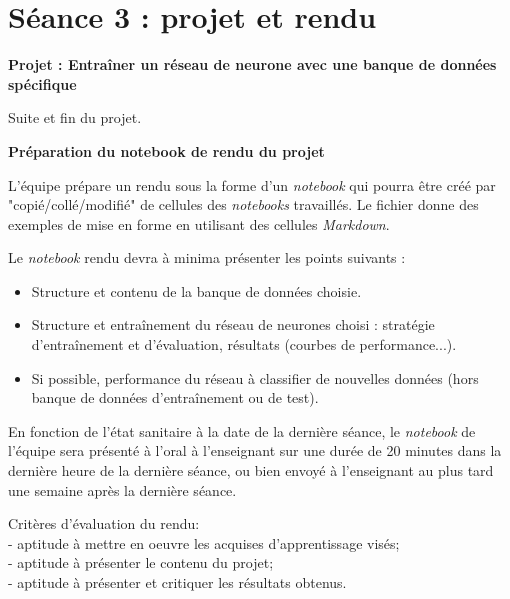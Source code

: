 \documentclass[11pt,french]{article}
\newcommand{\VDB}[1]{\VeryDarkBlue{#1}}
\newcommand{\file}[1]{{\ttfamily \VDB{#1}}}
\begin{document}
\newpage
\vspace*{-16mm}
\section*{ Séance 3 : projet et rendu}
%
\vspace*{-2mm}
\begin {bclogo}[noborder=true, couleurBarre=Chocolate, logo=\bctrombone]{}
  \vspace*{-4mm}\textbf{Projet : Entraîner un réseau de neurone avec une banque de données spécifique}
 
Suite et fin du projet.
\end{bclogo}
%
\vspace*{-5mm}
\begin {bclogo}[noborder=true, couleurBarre=Chocolate, logo=\bctrombone]{}
  \vspace*{-4mm}\textbf{Préparation du notebook de rendu du projet}

L'équipe prépare un rendu sous la forme d'un {\em notebook} qui pourra être créé par "copié/collé/modifié" de cellules des {\em notebooks} travaillés. 
Le fichier \file{template.ipynb} donne des exemples de mise en forme en utilisant des cellules {\em Markdown}.

Le {\em notebook} rendu devra à minima présenter les points suivants :
\begin{itemize}
\item Structure et contenu de la banque de données choisie.
\item Structure et entraînement du réseau de neurones choisi : stratégie d'entraînement et d'évaluation, résultats (courbes de performance...).
\item Si possible, performance du réseau à classifier de nouvelles données (hors banque de données d'entraînement ou de test).
\end{itemize}
\end{bclogo}  
%
\vspace*{-2mm}
En fonction de l'état sanitaire à la date de la dernière séance, le {\em notebook} de l'équipe sera présenté à l'oral à l'enseignant
sur une durée de 20 minutes dans la dernière heure de la dernière séance, ou bien envoyé à l'enseignant au plus tard une semaine après la dernière séance.

\vspace*{-2mm}
\bigskip
Critères d'évaluation du rendu: \\
- aptitude à mettre en oeuvre les acquises d'apprentissage visés;\\
- aptitude à présenter le contenu du projet;\\
- aptitude à présenter et critiquer les résultats obtenus.\\
\end{document}

